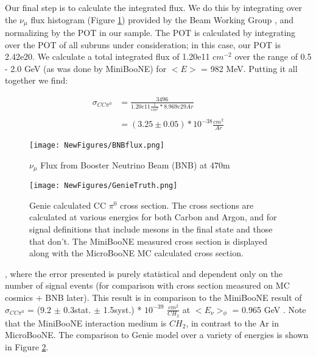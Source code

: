 \documentclass[12pt]{article}
\begin{document}
\par Our final step is to calculate the integrated flux.  We do this by integrating over the $\nu_\mu$ flux histogram (Figure \ref{fig:flux}) provided by the Beam Working Group \cite{bib:flux}, and normalizing by the POT in our sample. The POT is calculated by integrating over the POT of all subruns under consideration; in this case, our POT is 2.42e20.  We calculate a total integrated flux of 1.20e11 $cm^{-2}$ over the range of 0.5 - 2.0 GeV (as was done by MiniBooNE) for $<E>$ = 982 MeV. 
\noindent Putting it all together we find:


\begin{align}
\sigma_{CC\pi^0} &= \frac{3496}{1.20e11 \frac{1}{cm^2} * 8.969e29 Ar } \\\\
&= (3.25 \pm 0.05) *10^{-38} \frac{cm^2}{Ar}
\end{align}

\begin{figure}[h!]
\centering
\texttt{[image: NewFigures/BNBflux.png]}
\caption{$\nu_\mu$ Flux from Booster Neutrino Beam (BNB) at 470m }
\label{fig:flux}
\end{figure}

\begin{figure}[h!]
\centering
\texttt{[image: NewFigures/GenieTruth.png]}
\caption{Genie calculated CC $\pi^0$ cross section. The cross sections are calculated at various energies for both Carbon and Argon, and for signal definitions that include mesons in the final state and those that don't. The MiniBooNE measured cross section is displayed along with the MicroBooNE MC calculated cross section. }
\label{fig:genietruth}
\end{figure}

, where the error presented is purely statistical and dependent only on the number of signal events (for comparison with cross section measured on MC cosmics + BNB later).  This result is in comparison to the MiniBooNE result of $\sigma_{CC\pi^0}$ = (9.2 $\pm$ 0.3stat. $\pm$ 1.5syst.) * $10^{-39}$ $\frac{cm^2}{CH_2}$ at $<E_\nu>_\phi$ = 0.965 GeV \cite{bib:numucc_miniboone}.  Note that the MiniBooNE interaction medium is $CH_2$, in contrast to the Ar in MicroBooNE. The comparison to Genie model over a variety of energies is shown in Figure \ref{fig:genietruth}.
\end{document}
